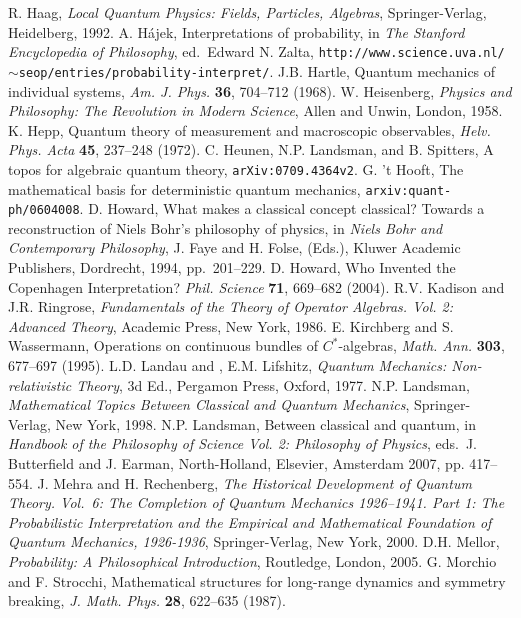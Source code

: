 \documentclass[12pt]{article}
\begin{document}
\begin{small}
\begin{thebibliography}{99}
   R.  Haag,  {\it Local Quantum Physics: Fields, Particles, Algebras},  Springer-Verlag, Heidelberg, 1992. 
 A. H\'{a}jek,  Interpretations of probability,  in {\it  The Stanford Encyclopedia of Philosophy}, ed.\  Edward N. Zalta,
\texttt{http://www.science.uva.nl/$\sim$seop/entries/probability-interpret/}.
 J.B. Hartle,  Quantum mechanics of individual systems, {\it Am. J. Phys.} {\bf 36}, 704--712 (1968).
 W. Heisenberg,  {\it Physics and Philosophy: The Revolution in Modern Science}, Allen and Unwin, London, 1958.
 K. Hepp,  Quantum theory of measurement and macroscopic observables,
{\it Helv. Phys.  Acta} {\bf 45}, 237--248 (1972).
 C. Heunen, N.P. Landsman, and B. Spitters, A topos for algebraic quantum theory,  \texttt{arXiv:0709.4364v2}.
 G. 't Hooft, The mathematical basis for deterministic quantum mechanics, \texttt{arxiv:quant-ph/0604008}.
  D.  Howard, What makes a classical concept classical? Towards a reconstruction of Niels Bohr's philosophy of physics, in  {\it Niels Bohr and Contemporary Philosophy},  J. Faye  and  H. Folse, (Eds.),  Kluwer Academic Publishers,  Dordrecht,
1994, pp.\ 201--229.
  D. Howard,  Who Invented the Copenhagen Interpretation? 
{\it Phil. Science} {\bf 71}, 669--682 (2004).
 R.V. Kadison  and J.R.  Ringrose,
{\it Fundamentals of the Theory of Operator Algebras. Vol. 2: Advanced  Theory},   Academic Press,  New York, 1986. 
  E. Kirchberg and S.
  Wassermann,  Operations on continuous bundles of
 $C^*$-algebras,  {\it Math. Ann. }  {\bf 303}, 677--697 (1995).
  L.D. Landau  and , E.M.  Lifshitz,
  {\it Quantum Mechanics: Non-relativistic Theory},
3d Ed.,  Pergamon Press,  Oxford, 1977.
 N.P.  Landsman,
 {\it Mathematical Topics Between Classical and Quantum Mechanics}, Springer-Verlag,  New York, 1998.
 N.P. Landsman,
Between classical and quantum, in   {\it Handbook of the Philosophy of Science Vol. 2: Philosophy of Physics}, eds.\ J. Butterfield and J. Earman,  North-Holland, Elsevier, Amsterdam 2007, pp. 417--554.
 J. Mehra  and H. Rechenberg,  {\it The Historical Development of Quantum Theory. Vol.\ 6: The Completion of Quantum Mechanics 1926--1941.    Part 1: The Probabilistic Interpretation and the Empirical and Mathematical Foundation of Quantum Mechanics, 1926-1936},  Springer-Verlag, New York, 2000.
 D.H. Mellor, {\it Probability: A Philosophical Introduction}, Routledge, London, 2005. 
  G. Morchio and  F. Strocchi,  Mathematical structures for long-range dynamics and symmetry breaking, {\it J.  Math. Phys.} {\bf 28}, 622--635 (1987).

\end{thebibliography}
\end{small}
\end{document}
